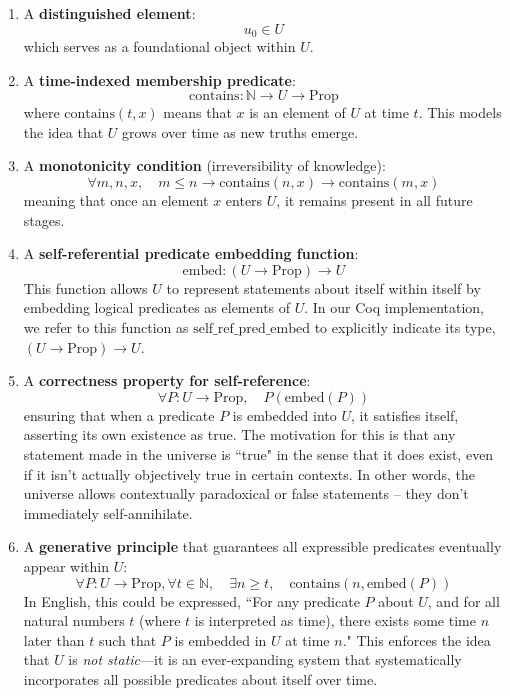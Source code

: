 \documentclass[12pt]{article}
\begin{document}
\begin{enumerate}
    \item A \textbf{distinguished element}:
    \[
    u_0 \in U
    \]
    which serves as a foundational object within \( U \).

    \item A \textbf{time-indexed membership predicate}:
    \[
    \text{contains}: \mathbb{N} \to U \to \text{Prop}
    \]
    where \( \text{contains}(t, x) \) means that \( x \) is an element of \( U \) at time \( t \). This models the idea that \( U \) grows over time as new truths emerge.

    \item A \textbf{monotonicity condition} (irreversibility of knowledge):
    \[
    \forall m, n, x, \quad m \leq n \rightarrow \text{contains}(n, x) \rightarrow \text{contains}(m, x)
    \]
    meaning that once an element \( x \) enters \( U \), it remains present in all future stages.

    \item A \textbf{self-referential predicate embedding function}:
    \[
    \text{embed}: (U \to \text{Prop}) \to U
    \]
    This function allows \( U \) to represent statements about itself within itself by embedding logical predicates as elements of \( U \). 
    In our Coq implementation, we refer to this function as $\text{self\_ref\_pred\_embed}$ to explicitly indicate its type, $(U \to \text{Prop}) \to U$.


    \item A \textbf{correctness property for self-reference}:
    \[
    \forall P: U \to \text{Prop}, \quad P(\text{embed}(P))
    \]
    ensuring that when a predicate \( P \) is embedded into \( U \), it satisfies itself, asserting its own existence as true. The motivation for this is that any statement made in the universe is ``true" in the sense that it does exist, even if it isn't actually objectively true in certain contexts. In other words, the universe allows contextually paradoxical or false statements -- they don't immediately self-annihilate.

    \item A \textbf{generative principle} that guarantees all expressible predicates eventually appear within \( U \):
    \[
    \forall P: U \to \text{Prop}, \forall t \in \mathbb{N}, \quad \exists n \geq t, \quad \text{contains}(n, \text{embed}(P))
    \]
    In English, this could be expressed, ``For any predicate $P$ about $U$, and for all natural numbers $t$ (where $t$ is interpreted as time), there exists some time $n$ later than $t$ such that $P$ is embedded in $U$ at time $n$." This enforces the idea that \( U \) is \textit{not static}—it is an ever-expanding system that systematically incorporates all possible predicates about itself over time.
\end{enumerate}
\end{document}
